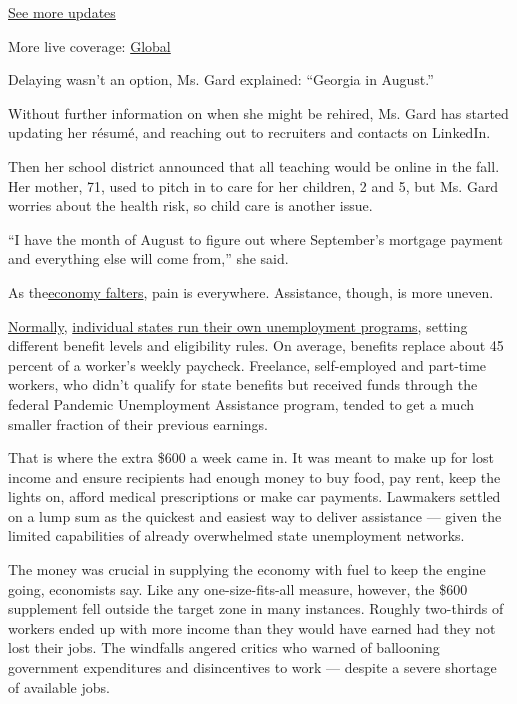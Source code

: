 \href{https://www.nytimes3xbfgragh.onion/live/2020/07/31/business/stock-market-today-coronavirus?action=click\&pgtype=Article\&state=default\&region=MAIN_CONTENT_1\&context=storylines_live_updates}{See
more updates}

More live coverage:
\href{https://www.nytimes3xbfgragh.onion/2020/08/01/world/coronavirus-covid-19.html?action=click\&pgtype=Article\&state=default\&region=MAIN_CONTENT_1\&context=storylines_live_updates}{Global}

Delaying wasn't an option, Ms. Gard explained: ``Georgia in August.''

Without further information on when she might be rehired, Ms. Gard has
started updating her résumé, and reaching out to recruiters and contacts
on LinkedIn.

Then her school district announced that all teaching would be online in
the fall. Her mother, 71, used to pitch in to care for her children, 2
and 5, but Ms. Gard worries about the health risk, so child care is
another issue.

``I have the month of August to figure out where September's mortgage
payment and everything else will come from,'' she said.

As
the\href{https://www.nytimes3xbfgragh.onion/2020/07/23/business/economy/unemployment-economy-coronavirus.html}{economy
falters}, pain is everywhere. Assistance, though, is more uneven.

\href{https://www.cbpp.org/research/economy/policy-basics-unemployment-insurance}{Normally},
\href{https://www.cbpp.org/research/economy/policy-basics-how-many-weeks-of-unemployment-compensation-are-available}{individual
states run their own unemployment programs}, setting different benefit
levels and eligibility rules. On average, benefits replace about 45
percent of a worker's weekly paycheck. Freelance, self-employed and
part-time workers, who didn't qualify for state benefits but received
funds through the federal Pandemic Unemployment Assistance program,
tended to get a much smaller fraction of their previous earnings.

That is where the extra \$600 a week came in. It was meant to make up
for lost income and ensure recipients had enough money to buy food, pay
rent, keep the lights on, afford medical prescriptions or make car
payments. Lawmakers settled on a lump sum as the quickest and easiest
way to deliver assistance --- given the limited capabilities of already
overwhelmed state unemployment networks.

The money was crucial in supplying the economy with fuel to keep the
engine going, economists say. Like any one-size-fits-all measure,
however, the \$600 supplement fell outside the target zone in many
instances. Roughly two-thirds of workers ended up with more income than
they would have earned had they not lost their jobs. The windfalls
angered critics who warned of ballooning government expenditures and
disincentives to work --- despite a severe shortage of available jobs.

